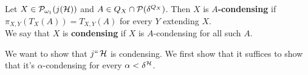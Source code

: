 \documentclass[../../main]{subfiles}
\begin{document}
\begin{definition}
   Let $X\in\P_{\omega_1}(j(\h))$ and
  $A\in Q_X\cap\P(\delta^{Q_X})$. Then $X$ is \textbf{$A$-condensing} if
  $\pi_{X,Y}(T_{X}(A))=T_{X,Y}(A)$ for every $Y$ extending $X$. \\
  We say that $X$ is \textbf{condensing} if $X$ is $A$-condensing for
  all such $A$.
\end{definition}

We want to show that $j``\h$ is condensing. We first show that it suffices to show that it's $\alpha$-condensing for every $\alpha<\delta^{\h}$.


\end{document}
